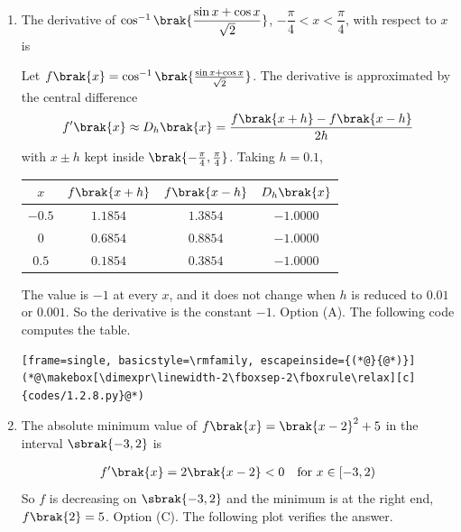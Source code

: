 \begin{enumerate}[label=\thesubsection.\arabic*, ref=\thesubsection.\theenumi]
\item The derivative of $\cos^{-1}\brak{\dfrac{\sin x + \cos x}{\sqrt{2}}}$, $-\dfrac{\pi}{4} < x < \dfrac{\pi}{4}$, with respect to $x$ is
\begin{enumerate}[label=(\Alph*)]
	\begin{multicols}{4}
	\item $-1$
	\item $1$
	\item $\frac{\pi}{4}$
	\item $-\frac{\pi}{4}$
	\end{multicols}
\end{enumerate}
\par\solution
Let $f\brak{x} = \cos^{-1}\brak{\frac{\sin x + \cos x}{\sqrt{2}}}$. The derivative is approximated by the central difference
\begin{align}
	f^{\prime}\brak{x} \approx D_h\brak{x} = \frac{f\brak{x+h} - f\brak{x-h}}{2h}
\end{align}
with $x \pm h$ kept inside $\brak{-\frac{\pi}{4}, \frac{\pi}{4}}$. Taking $h = 0.1$,
\begin{center}
\begin{tabular}{|c|c|c|c|}
	\hline
	$x$ & $f\brak{x+h}$ & $f\brak{x-h}$ & $D_h\brak{x}$ \\
	\hline
	$-0.5$ & $1.1854$ & $1.3854$ & $-1.0000$ \\
	$0$ & $0.6854$ & $0.8854$ & $-1.0000$ \\
	$0.5$ & $0.1854$ & $0.3854$ & $-1.0000$ \\
	\hline
\end{tabular}
\end{center}
The value is $-1$ at every $x$, and it does not change when $h$ is reduced to $0.01$ or $0.001$. So the derivative is the constant $-1$. Option (A).
The following code computes the table.
\begin{lstlisting}[frame=single, basicstyle=\rmfamily, escapeinside={(*@}{@*)}]
(*@\makebox[\dimexpr\linewidth-2\fboxsep-2\fboxrule\relax][c]{codes/1.2.8.py}@*)
\end{lstlisting}

\item The absolute minimum value of $f\brak{x} = \brak{x-2}^2 + 5$ in the interval $\sbrak{-3, 2}$ is
\begin{enumerate}[label=(\Alph*)]
\end{enumerate}
\par\solution
\begin{align}
	f^{\prime}\brak{x} = 2\brak{x-2} < 0 \quad \text{for } x \in \left[-3, 2\right)
\end{align}
So $f$ is decreasing on $\sbrak{-3,2}$ and the minimum is at the right end,
$f\brak{2} = 5$. Option (C). The following plot verifies the answer.


\end{enumerate}
